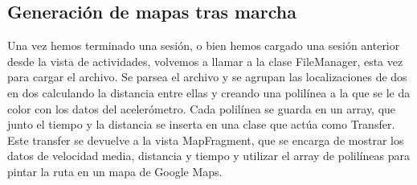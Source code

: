 \subsection{Generación de mapas tras marcha}
\label{makereference6.2.4}

Una vez hemos terminado una sesión, o bien hemos cargado una sesión anterior desde la vista de actividades, volvemos a llamar a la clase FileManager, esta vez para cargar el archivo. Se parsea el archivo y se agrupan las localizaciones de dos en dos calculando la distancia entre ellas y creando una polilínea a la que se le da color con los datos del acelerómetro. Cada polilínea se guarda en un array, que junto el tiempo y la distancia se inserta en una clase que actúa como Transfer. Este transfer se devuelve a la vista MapFragment, que se encarga de mostrar los datos de velocidad media, distancia y tiempo y utilizar el array de polilíneas para pintar la ruta en un mapa de Google Maps.